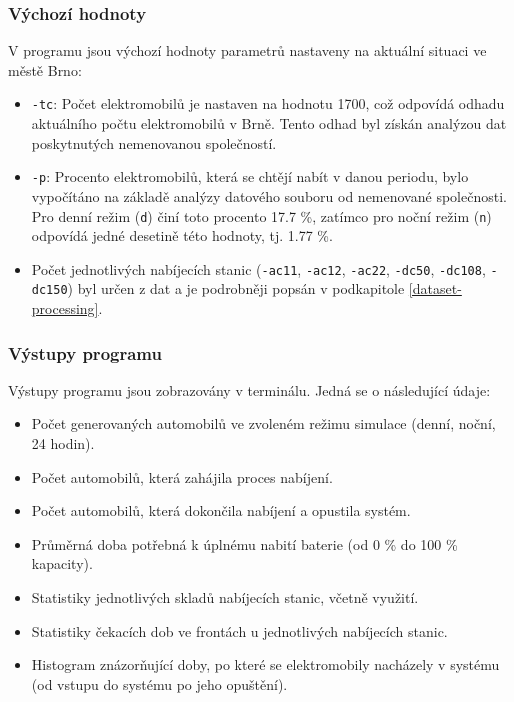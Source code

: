 \documentclass[a4paper,11pt]{article}
\begin{document}
\subsubsection{Výchozí hodnoty}
V programu jsou výchozí hodnoty parametrů nastaveny na aktuální situaci ve městě Brno:
\begin{itemize}

    \item \texttt{-tc}: Počet elektromobilů je nastaven na hodnotu 1700, což odpovídá odhadu aktuálního počtu elektromobilů v Brně. Tento odhad byl získán analýzou dat poskytnutých nemenovanou společností.
    \item \texttt{-p}: Procento elektromobilů, která se chtějí nabít v danou periodu, bylo vypočítáno na základě analýzy datového souboru od nemenované společnosti. Pro denní režim (\texttt{d}) činí toto procento 17.7 \%, zatímco pro noční režim (\texttt{n}) odpovídá jedné desetině této hodnoty, tj. 1.77 \%.
    \item Počet jednotlivých nabíjecích stanic (\texttt{-ac11}, \texttt{-ac12}, \texttt{-ac22}, \texttt{-dc50}, \texttt{-dc108}, \texttt{-dc150}) byl určen z dat a je podrobněji popsán v podkapitole \ref{dataset-processing}.
\end{itemize}

\subsubsection{Výstupy programu}

Výstupy programu jsou zobrazovány v terminálu. Jedná se o následující údaje:
\begin{itemize}
    \item Počet generovaných automobilů ve zvoleném režimu simulace (denní, noční, 24 hodin).
    \item Počet automobilů, která zahájila proces nabíjení.
    \item Počet automobilů, která dokončila nabíjení a opustila systém.
    \item Průměrná doba potřebná k úplnému nabití baterie (od 0 \% do 100 \% kapacity).
    \item Statistiky jednotlivých skladů nabíjecích stanic, včetně využití.
    \item Statistiky čekacích dob ve frontách u jednotlivých nabíjecích stanic.
    \item Histogram znázorňující doby, po které se elektromobily nacházely v systému (od vstupu do systému po jeho opuštění).
\end{itemize}
\end{document}
